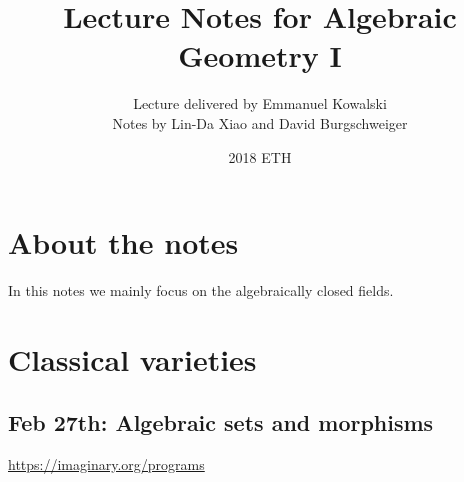 \documentclass[11pt]{article}
\title{\bf Lecture Notes for Algebraic Geometry I}
\author{Lecture delivered by Emmanuel Kowalski\\
Notes by Lin-Da Xiao and David Burgschweiger}
\date{2018 ETH}
\begin{document}
\maketitle
\tableofcontents
\section*{About the notes}
In this notes we mainly focus on the algebraically closed fields.
\newpage
\section{Classical varieties}
\subsection{Feb 27th: Algebraic sets and morphisms}
\href{https://imaginary.org/programs}{https://imaginary.org/programs}
\end{document}
